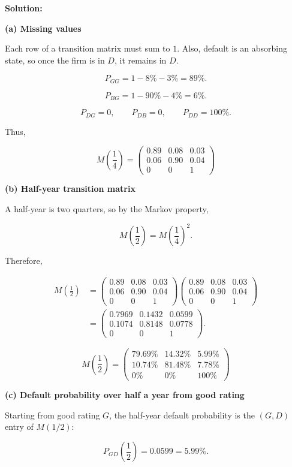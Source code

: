 \documentclass{article}
\begin{document}
\vspace{4pt}

\textbf{Solution:}

\textbf{(a) Missing values}

Each row of a transition matrix must sum to $1$. Also, default is an absorbing state, so once the firm is in $D$, it remains in $D$.

\[
P_{GG}=1-8\%-3\%=89\%.
\]

\[
P_{BG}=1-90\%-4\%=6\%.
\]

\[
P_{DG}=0, \qquad P_{DB}=0, \qquad P_{DD}=100\%.
\]

Thus,

\[
\boxed{
M\left(\frac14\right)
=
\begin{pmatrix}
0.89 & 0.08 & 0.03 \\
0.06 & 0.90 & 0.04 \\
0 & 0 & 1
\end{pmatrix}
}
\]

\textbf{(b) Half-year transition matrix}

A half-year is two quarters, so by the Markov property,

\[
M\left(\frac12\right)
=
M\left(\frac14\right)^2.
\]

Therefore,

\begin{align*}
M\left(\frac12\right)
&=
\begin{pmatrix}
0.89 & 0.08 & 0.03 \\
0.06 & 0.90 & 0.04 \\
0 & 0 & 1
\end{pmatrix}
\begin{pmatrix}
0.89 & 0.08 & 0.03 \\
0.06 & 0.90 & 0.04 \\
0 & 0 & 1
\end{pmatrix} \\
&=
\begin{pmatrix}
0.7969 & 0.1432 & 0.0599 \\
0.1074 & 0.8148 & 0.0778 \\
0 & 0 & 1
\end{pmatrix}.
\end{align*}

\[
\boxed{
M\left(\frac12\right)
=
\begin{pmatrix}
79.69\% & 14.32\% & 5.99\% \\
10.74\% & 81.48\% & 7.78\% \\
0\% & 0\% & 100\%
\end{pmatrix}
}
\]

\textbf{(c) Default probability over half a year from good rating}

Starting from good rating $G$, the half-year default probability is the $(G,D)$ entry of $M(1/2)$:

\[
\boxed{P_{GD}\left(\frac12\right)=0.0599=5.99\%.}
\]
\end{document}
